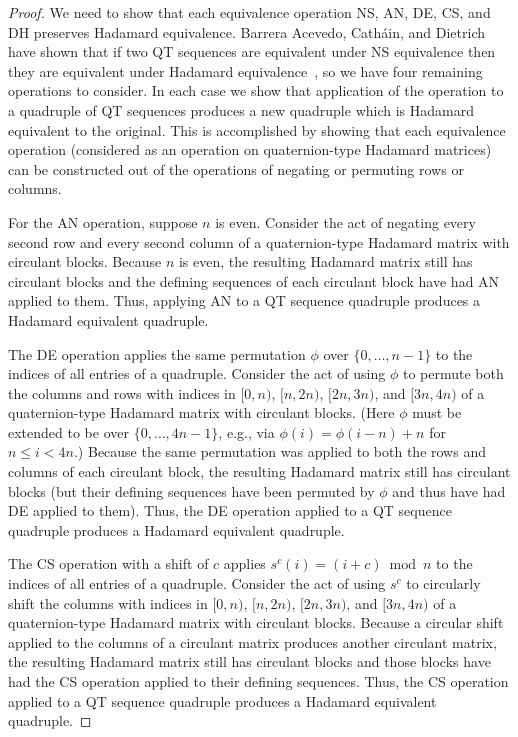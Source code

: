\documentclass[12pt]{article}
\numberwithin{equation}{section}
\begin{document}
\begin{proof}
We need to show that each equivalence operation
NS, AN, DE, CS, and DH preserves Hadamard equivalence.
Barrera Acevedo, Cath\'{a}in, and Dietrich have shown that if two QT sequences are
equivalent under NS equivalence then they are equivalent under Hadamard equivalence~\cite[Prop.~4.4(a,b)]{BarreraAcevedo2019},
so we have four remaining operations to consider.
In each case we show that application of the operation
to a quadruple of QT sequences produces a new quadruple which
is Hadamard equivalent to the original.  This is accomplished
by showing that each equivalence operation (considered as an operation
on quaternion-type Hadamard matrices) can be constructed out of the
operations of negating or permuting rows or columns.

For the AN operation, suppose $n$ is even.  Consider the act of
negating every second row and every second column of a quaternion-type
Hadamard matrix with circulant blocks.  Because $n$ is even, the resulting
Hadamard matrix still has circulant blocks and the defining sequences of each
circulant block have had AN applied to them.  Thus, applying AN to a QT sequence quadruple
produces a Hadamard equivalent quadruple.

The DE operation applies the same permutation $\phi$ over $\{0,\dotsc,n-1\}$ to
the indices of all entries of a quadruple.
Consider the act of using $\phi$ to permute both the columns and rows
with indices in $[0,n)$, $[n,2n)$, $[2n,3n)$, and $[3n,4n)$ of a quaternion-type
Hadamard matrix with circulant blocks.  (Here $\phi$ must be extended
to be over $\{0,\dotsc,4n-1\}$, e.g., via $\phi(i)=\phi(i-n)+n$ for $n\leq i<4n$.)
Because the same permutation was applied to both the rows and columns of each
circulant block, the resulting Hadamard matrix still has circulant blocks
(but their defining sequences have been permuted by $\phi$ and thus have had
DE applied to them).  Thus, the DE operation applied to a QT sequence quadruple
produces a Hadamard equivalent quadruple.

The CS operation with a shift of $c$ applies $s^c(i)=(i+c)\bmod n$ to
the indices of all entries of a quadruple.
Consider the act of using $s^c$ to circularly shift the columns with indices
in $[0,n)$, $[n,2n)$, $[2n,3n)$, and $[3n,4n)$ of a quaternion-type
Hadamard matrix with circulant blocks.
Because a circular shift applied to the columns of a circulant matrix produces
another circulant matrix, the resulting Hadamard matrix still has circulant
blocks and those blocks have had the CS operation applied to their defining
sequences.  Thus, the CS operation applied to a QT sequence quadruple
produces a Hadamard equivalent quadruple.


\end{proof}
\end{document}
